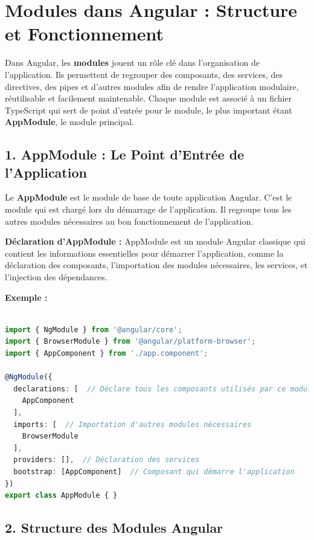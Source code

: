 \documentclass{article}
\begin{document}
\section*{Modules dans Angular : Structure et Fonctionnement}

Dans Angular, les \textbf{modules} jouent un rôle clé dans l'organisation de l'application. Ils permettent de regrouper des composants, des services, des directives, des pipes et d'autres modules afin de rendre l'application modulaire, réutilisable et facilement maintenable. Chaque module est associé à un fichier TypeScript qui sert de point d'entrée pour le module, le plus important étant \textbf{AppModule}, le module principal.

\subsection*{1. AppModule : Le Point d'Entrée de l'Application}

Le \textbf{AppModule} est le module de base de toute application Angular. C'est le module qui est chargé lors du démarrage de l'application. Il regroupe tous les autres modules nécessaires au bon fonctionnement de l'application.

\textbf{Déclaration d'AppModule :}  
AppModule est un module Angular classique qui contient les informations essentielles pour démarrer l'application, comme la déclaration des composants, l'importation des modules nécessaires, les services, et l’injection des dépendances.

\textbf{Exemple :}  
\begin{lstlisting}[language=TypeScript, caption={Using a service in a component}, label={lst:typescript-service-usage}]

import { NgModule } from '@angular/core';
import { BrowserModule } from '@angular/platform-browser';
import { AppComponent } from './app.component';

@NgModule({
  declarations: [  // Déclare tous les composants utilisés par ce module
    AppComponent
  ],
  imports: [  // Importation d'autres modules nécessaires
    BrowserModule
  ],
  providers: [],  // Déclaration des services
  bootstrap: [AppComponent]  // Composant qui démarre l'application
})
export class AppModule { }
\end{lstlisting}

\subsection*{2. Structure des Modules Angular}
\end{document}
